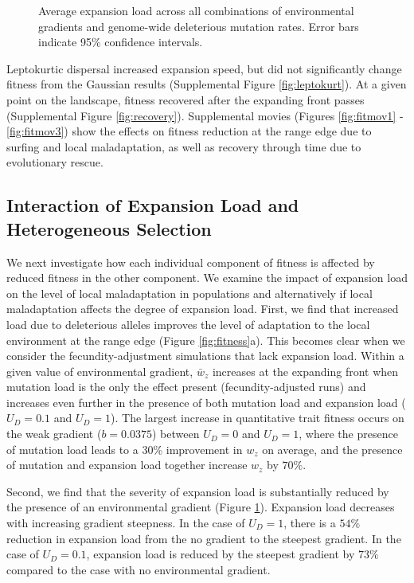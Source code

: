 \begin{figure}[h]
\centering
{}
\caption[Average expansion load.]{Average expansion load across all combinations of environmental gradients and genome-wide deleterious mutation rates. Error bars indicate 95\% confidence intervals.}
\label{fig:load}
\end{figure}


Leptokurtic dispersal increased expansion speed, but did not significantly change fitness from the Gaussian results (Supplemental Figure \ref{fig:leptokurt}). At a given point on the landscape, fitness recovered after the expanding front passes (Supplemental Figure \ref{fig:recovery}). Supplemental movies (Figures \ref{fig:fitmov1} - \ref{fig:fitmov3}) show the effects on fitness reduction at the range edge due to surfing and local maladaptation, as well as recovery through time due to evolutionary rescue. 


\subsection{Interaction of Expansion Load and Heterogeneous Selection}

We next investigate how each individual component of fitness is affected by reduced fitness in the other component. We examine the impact of expansion load on the level of local maladaptation in populations and alternatively if local maladaptation affects the degree of expansion load. First, we find that increased load due to deleterious alleles improves the level of adaptation to the local environment at the range edge (Figure \ref{fig:fitness}a). This becomes clear when we consider the fecundity-adjustment simulations that lack expansion load. Within a given value of environmental gradient, $\bar{w}_z$ increases at the expanding front when mutation load is the only the effect present (fecundity-adjusted runs) and increases even further in the presence of both mutation load and expansion load  ($U_D = 0.1$ and $U_D = 1$). The largest increase in quantitative trait fitness occurs on the weak gradient ($b = 0.0375$) between $U_D = 0$ and $U_D = 1$, where the presence of mutation load leads to a $30\%$ improvement in $w_z$ on average, and the presence of mutation and expansion load together increase $w_z$ by $70\%$. 

Second, we find that the severity of expansion load is substantially reduced by the presence of an environmental gradient (Figure \ref{fig:load}). Expansion load decreases with increasing gradient steepness. In the case of $U_D = 1$, there is a $54\%$ reduction in expansion load from the no gradient to the steepest gradient. In the case of $U_D = 0.1$, expansion load is reduced by the steepest gradient by $73\%$ compared to the case with no environmental gradient. 



